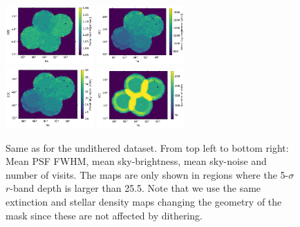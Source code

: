 \documentclass[a4paper,fleqn,usenatbib]{mnras}
\begin{document}
\begin{figure}
\centering
\includegraphics[width=0.30\textwidth]{ud_mean_fwhm.png}
\includegraphics[width=0.30\textwidth]{ud_mean_sky.png}\\
\includegraphics[width=0.30\textwidth]{ud_mean_skynoise.png}
\includegraphics[width=0.30\textwidth]{ud_nvisits.png}
\caption{Same as  for the undithered dataset. From top left to bottom right: Mean PSF FWHM, mean sky-brightness, mean sky-noise and number of visits. The maps are only shown in regions where the 5-$\sigma$ $r$-band depth is larger than 25.5. Note that we use the same extinction and stellar density maps changing the geometry of the mask since these are not affected by dithering.}
\label{fig:systematic_maps_ud}
\end{figure}
\end{document}
